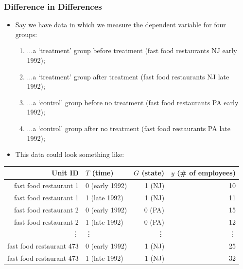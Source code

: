 \documentclass[aspectratio=169]{beamer}
\theoremstyle{principle}
\begin{document}
\begin{frame}
\frametitle{Difference in Differences}

\begin{itemize}
\item Say we have data in which we measure the dependent variable for four groups:
\begin{enumerate}
\item ...a `treatment' group before treatment (fast food restaurants NJ early 1992);
\item \color{black}...a `treatment' group after treatment (fast food restaurants NJ late 1992);
\item \color{black}...a `control' group before no treatment (fast food restaurants PA early 1992);
\item \color{black}...a `control' group after no treatment (fast food restaurants PA late 1992);
\end{enumerate}
\bigskip

\item This data could look something like:
\end{itemize}

\begin{table}[ht]
\centering
\begin{tabular}{rlrr}
  \hline
  \hline
Unit ID & $T$ (time) & $G$ (state) & $y$ (\# of employees) \\ 
  \hline
    \hline
fast food restaurant 1& 0 (early 1992) & 1 (NJ) & 10 \\ 
fast food restaurant 1 & 1 (late 1992) & 1 (NJ) & 11 \\ 
fast food restaurant 2 & 0 (early 1992) & 0 (PA) & 15 \\ 
fast food restaurant 2 & 1 (late 1992) & 0 (PA) & 12 \\ 
\vdots&\vdots&\vdots&\vdots\\
fast food restaurant 473 & 0 (early 1992) & 1 (NJ) & 25 \\ 
fast food restaurant 473 & 1 (late 1992) & 1 (NJ) & 32 \\ 
   \hline
      \hline
\end{tabular}
\end{table}

\end{frame}
\end{document}
